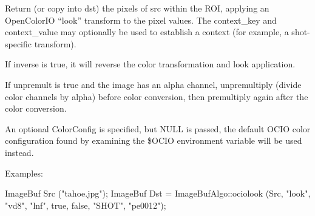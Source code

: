  
Return (or copy into {\cf dst}) the pixels of {\cf src} within the ROI,
applying an OpenColorIO ``look'' transform to the pixel values.
The {\cf context_key} and {\cf context_value} may optionally be used
to establish a context (for example, a shot-specific transform).

If {\cf inverse} is {\cf true}, it will reverse the color transformation
and look application.

If {\cf unpremult} is {\cf true} and the image has an alpha channel,
unpremultiply (divide color channels by alpha) before color conversion, then
premultiply again after the color conversion.

An optional {\cf ColorConfig} is specified, but {\cf NULL} is passed, the
default OCIO color configuration found by examining the {\cf \$OCIO}
environment variable will be used instead.

\smallskip
\noindent Examples:
\begin{code}
    ImageBuf Src ("tahoe.jpg");
    ImageBuf Dst = ImageBufAlgo::ociolook (Src, "look", "vd8", "lnf",
                                           true, false, "SHOT", "pe0012");
\end{code}
\apiend



